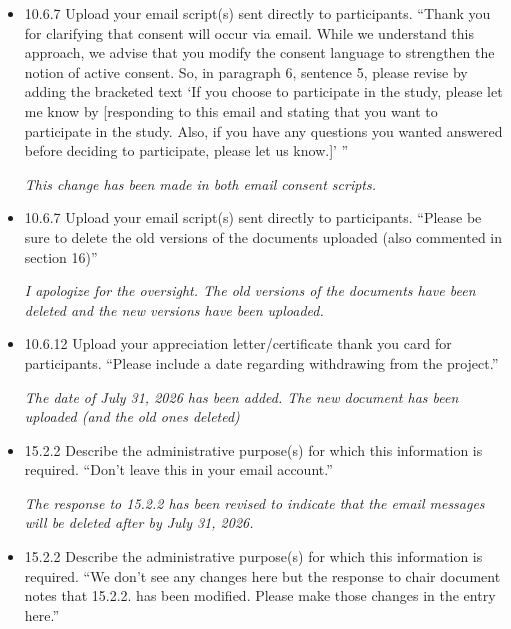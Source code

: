 \documentclass[12pt]{casletter}
\begin{document}
\begin{letter}
\begin{itemize}
\emph{The question mark was not intentional; it has been removed.  This change
should now be reflected in the revised form.} \smallskip

\item 10.6.7 Upload your email script(s) sent directly to participants. ``Thank
you for clarifying that consent will occur via email. While we understand this
approach, we advise that you modify the consent language to strengthen the
notion of active consent. So, in paragraph 6, sentence 5, please revise by adding
the bracketed text `If you choose to participate in the study, please let me
know by [responding to this email and stating that you want to participate in
the study. Also, if you have any questions you wanted answered before deciding
to participate, please let us know.]' ''
\medskip

\emph{This change has been made in both email consent scripts.} \smallskip

\item 10.6.7 Upload your email script(s) sent directly to participants. ``Please be sure to delete the old versions of the documents uploaded (also commented in section 16)''
\medskip

\emph{I apologize for the oversight.  The old versions of the documents have
been deleted and the new versions have been uploaded.} \smallskip

\item 10.6.12 Upload your appreciation letter/certificate thank you card for
participants.  ``Please include a date regarding withdrawing from the project.'' \medskip

\emph{The date of July 31, 2026 has been added.  The new document has been uploaded (and the old ones deleted)} \smallskip

\item 15.2.2 Describe the administrative purpose(s) for which this information
is required. ``Don't leave this in your email account.'' \medskip

\emph{The response to 15.2.2 has been revised to indicate that the email messages will be 
deleted after by July 31, 2026.}

\smallskip

\item 15.2.2 Describe the administrative purpose(s) for which this information
is required. ``We don't see any changes here but the response to chair document
notes that 15.2.2. has been modified. Please make those changes in the entry
here.'' \medskip


\end{itemize}
\end{letter}
\end{document}
